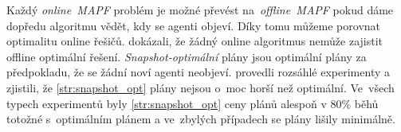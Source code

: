 Každý \emph{online~MAPF} problém je možné převést na~\emph{offline~MAPF} pokud dáme dopředu algoritmu vědět, kdy se agenti objeví.
Díky tomu můžeme porovnat optimalitu online řešičů.
\citet{Svancara} dokázali, že žádný online algoritmus nemůže zajistit offline optimální řešení.
\emph{Snapshot-optimální} plány jsou optimální plány za předpokladu,
že se žádní noví agenti neobjeví.
\citet*{Morag} provedli rozsáhlé experimenty a zjistili, že \ref{str:snapshot_opt} plány nejsou o~moc horší než optimální.
Ve~všech typech experimentů \citet{Morag} byly \ref{str:snapshot_opt} ceny plánů alespoň v $80\%$ běhů totožné s~optimálním plánem
a ve~zbylých případech se plány lišily minimálně.


%
%
